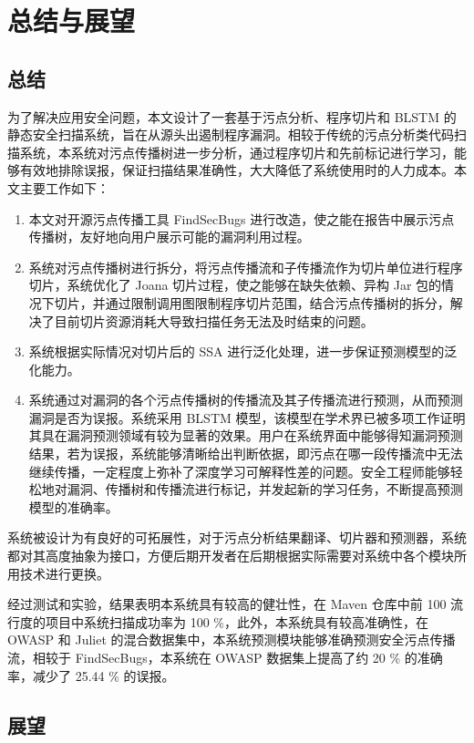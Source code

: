 \chapter{总结与展望}
\section{总结}
为了解决应用安全问题，本文设计了一套基于污点分析、程序切片和 BLSTM 的静态安全扫描系统，旨在从源头出遏制程序漏洞。相较于传统的污点分析类代码扫描系统，本系统对污点传播树进一步分析，通过程序切片和先前标记进行学习，能够有效地排除误报，保证扫描结果准确性，大大降低了系统使用时的人力成本。本文主要工作如下：


\begin{enumerate}
    \item 本文对开源污点传播工具 FindSecBugs 进行改造，使之能在报告中展示污点传播树，友好地向用户展示可能的漏洞利用过程。
    \item 系统对污点传播树进行拆分，将污点传播流和子传播流作为切片单位进行程序切片，系统优化了 Joana 切片过程，使之能够在缺失依赖、异构 Jar 包的情况下切片，并通过限制调用图限制程序切片范围，结合污点传播树的拆分，解决了目前切片资源消耗大导致扫描任务无法及时结束的问题。
    \item 系统根据实际情况对切片后的 SSA 进行泛化处理，进一步保证预测模型的泛化能力。
    \item 系统通过对漏洞的各个污点传播树的传播流及其子传播流进行预测，从而预测漏洞是否为误报。系统采用 BLSTM 模型，该模型在学术界已被多项工作证明其具在漏洞预测领域有较为显著的效果。用户在系统界面中能够得知漏洞预测结果，若为误报，系统能够清晰给出判断依据，即污点在哪一段传播流中无法继续传播，一定程度上弥补了深度学习可解释性差的问题。安全工程师能够轻松地对漏洞、传播树和传播流进行标记，并发起新的学习任务，不断提高预测模型的准确率。
\end{enumerate}

系统被设计为有良好的可拓展性，对于污点分析结果翻译、切片器和预测器，系统都对其高度抽象为接口，方便后期开发者在后期根据实际需要对系统中各个模块所用技术进行更换。

经过测试和实验，结果表明本系统具有较高的健壮性，在 Maven 仓库中前 100 流行度的项目中系统扫描成功率为 100 \%，此外，本系统具有较高准确性，在 OWASP 和 Juliet 的混合数据集中，本系统预测模块能够准确预测安全污点传播流，相较于 FindSecBugs，本系统在 OWASP 数据集上提高了约 20 \% 的准确率，减少了 25.44 \% 的误报。

\section{展望}

